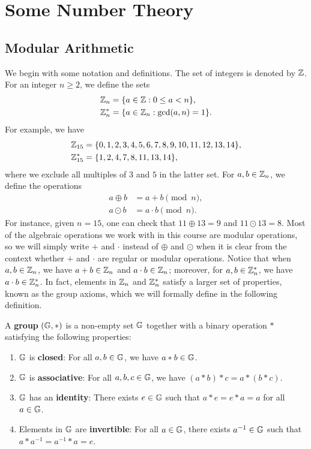 \section{Some Number Theory}

\subsection{Modular Arithmetic}
We begin with some notation and definitions. The set of integers is denoted by $\mathbb{Z}$. For an 
integer $n \geq 2$, we define the sets 
\begin{align*}
    \mathbb{Z}_n &= \{a \in \mathbb{Z} : 0 \leq a < n\}, \\ \mathbb{Z}_n^* &= \{a \in \mathbb{Z}_n : \gcd(a, n) = 1\}. 
\end{align*}
For example, we have 
\begin{align*}
    \mathbb{Z}_{15} &= \{0, 1, 2, 3, 4, 5, 6, 7, 8, 9, 10, 11, 12, 13, 14\}, \\
    \mathbb{Z}_{15}^* &= \{1,2,4,7,8,11,13,14\},
\end{align*}
where we exclude all multiples of $3$ and $5$ in the latter set. 
For $a, b \in \mathbb{Z}_n$, we define the operations 
\begin{align*}
    a \oplus b &= a + b \pmod n, \\
    a \odot b &= a \cdot b \pmod n.
\end{align*}
For instance, given $n = 15$, one can check that $11 \oplus 13 = 9$ and $11 \odot 13 = 8$. 
Most of the algebraic operations we work with in this course are modular operations, so we will simply 
write $+$ and $\cdot$ instead of $\oplus$ and $\odot$ when it is clear from the context 
whether $+$ and $\cdot$ are regular or modular operations. 
Notice that when $a, b \in \mathbb{Z}_n$, we have $a + b \in \mathbb{Z}_n$ and $a \cdot b \in \mathbb{Z}_n$; moreover, 
for $a, b \in \mathbb{Z}_n^*$, we have $a \cdot b \in \mathbb{Z}_n^*$. In fact, elements in $\mathbb{Z}_n$ and 
$\mathbb{Z}_n^*$ satisfy a larger set of properties, known as the group axioms, which we will 
formally define in the following definition.

\begin{defn}
A {\bf group} $(\mathbb{G}, *)$ is a non-empty set $\mathbb{G}$ together with a binary operation $*$ satisfying the 
following properties:
\begin{enumerate}[(1)]
    \item $\mathbb{G}$ is {\bf closed}: For all $a, b \in \mathbb{G}$, we have $a * b \in \mathbb{G}$. 
    \item $\mathbb{G}$ is {\bf associative}: For all $a, b, c \in \mathbb{G}$, we have $(a * b) * c = a * (b * c)$. 
    \item $\mathbb{G}$ has an {\bf identity}: There exists $e \in \mathbb{G}$ such that $a * e = e * a = a$ for all $a \in \mathbb{G}$.
    \item Elements in $\mathbb{G}$ are {\bf invertible}: For all $a \in \mathbb{G}$, there exists $a^{-1} \in \mathbb{G}$ 
    such that $a * a^{-1} = a^{-1} * a = e$. 
\end{enumerate}
\end{defn}

